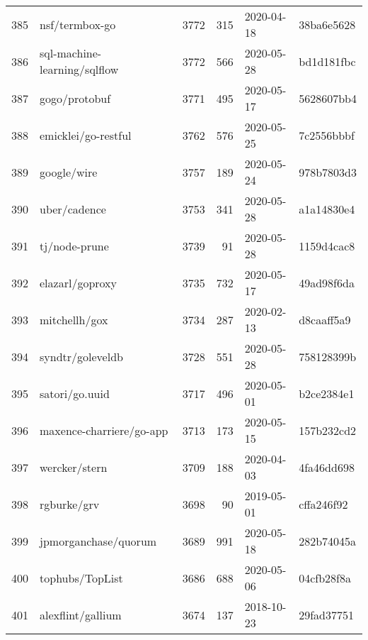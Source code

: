 \begin{footnotesize}
\begin{longtable}{llrrll}
        385 &                                     nsf/termbox-go &   3772 &    315 & 2020-04-18 &  38ba6e5628 \\
        386 &                       sql-machine-learning/sqlflow &   3772 &    566 & 2020-05-28 &  bd1d181fbc \\
        387 &                                      gogo/protobuf &   3771 &    495 & 2020-05-17 &  5628607bb4 \\
        388 &                                emicklei/go-restful &   3762 &    576 & 2020-05-25 &  7c2556bbbf \\
        389 &                                        google/wire &   3757 &    189 & 2020-05-24 &  978b7803d3 \\
        390 &                                       uber/cadence &   3753 &    341 & 2020-05-28 &  a1a14830e4 \\
        391 &                                      tj/node-prune &   3739 &     91 & 2020-05-28 &  1159d4cac8 \\
        392 &                                    elazarl/goproxy &   3735 &    732 & 2020-05-17 &  49ad98f6da \\
        393 &                                      mitchellh/gox &   3734 &    287 & 2020-02-13 &  d8caaff5a9 \\
        394 &                                   syndtr/goleveldb &   3728 &    551 & 2020-05-28 &  758128399b \\
        395 &                                     satori/go.uuid &   3717 &    496 & 2020-05-01 &  b2ce2384e1 \\
        396 &                           maxence-charriere/go-app &   3713 &    173 & 2020-05-15 &  157b232cd2 \\
        397 &                                      wercker/stern &   3709 &    188 & 2020-04-03 &  4fa46dd698 \\
        398 &                                        rgburke/grv &   3698 &     90 & 2019-05-01 &  cffa246f92 \\
        399 &                               jpmorganchase/quorum &   3689 &    991 & 2020-05-18 &  282b74045a \\
        400 &                                    tophubs/TopList &   3686 &    688 & 2020-05-06 &  04cfb28f8a \\
        401 &                                  alexflint/gallium &   3674 &    137 & 2018-10-23 &  29fad37751 \\

\end{longtable}
\end{footnotesize}
